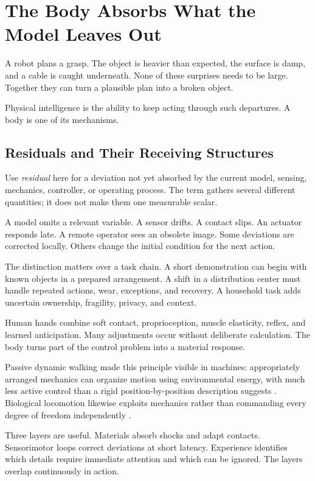 \documentclass[11pt,openany]{book}
\begin{document}
\section{The Body Absorbs What the Model Leaves Out}

A robot plans a grasp. The object is heavier than expected, the surface is damp, and a cable is caught underneath. None of these surprises needs to be large. Together they can turn a plausible plan into a broken object.

Physical intelligence is the ability to keep acting through such departures. A body is one of its mechanisms.

\subsection{Residuals and Their Receiving Structures}

Use \emph{residual} here for a deviation not yet absorbed by the current model, sensing, mechanics, controller, or operating process. The term gathers several different quantities; it does not make them one measurable scalar.

A model omits a relevant variable. A sensor drifts. A contact slips. An actuator responds late. A remote operator sees an obsolete image. Some deviations are corrected locally. Others change the initial condition for the next action.

The distinction matters over a task chain. A short demonstration can begin with known objects in a prepared arrangement. A shift in a distribution center must handle repeated actions, wear, exceptions, and recovery. A household task adds uncertain ownership, fragility, privacy, and context.

Human hands combine soft contact, proprioception, muscle elasticity, reflex, and learned anticipation. Many adjustments occur without deliberate calculation. The body turns part of the control problem into a material response.

Passive dynamic walking made this principle visible in machines: appropriately arranged mechanics can organize motion using environmental energy, with much less active control than a rigid position-by-position description suggests \cite{mcgeer1990,collins2005}. Biological locomotion likewise exploits mechanics rather than commanding every degree of freedom independently \cite{full1999}.

Three layers are useful. Materials absorb shocks and adapt contacts. Sensorimotor loops correct deviations at short latency. Experience identifies which details require immediate attention and which can be ignored. The layers overlap continuously in action.
\end{document}
